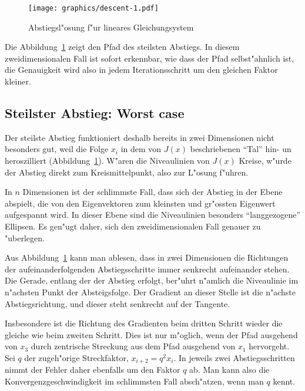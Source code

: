 \begin{figure}
\begin{center}
\texttt{[image: graphics/descent-1.pdf]}
\end{center}
\caption{Abstiegsl"osung f"ur lineares Gleichungsystem
\label{descent:path}}
\end{figure}

Die Abbildung~\ref{descent:path} zeigt den Pfad des steilsten Abstiegs.
In diesem zweidimensionalen Fall ist sofort erkennbar, wie dass der
Pfad selbst"ahnlich ist, die Genauigkeit wird also in jedem Iterationsschritt
um den gleichen Faktor kleiner.

\subsection{Steilster Abstieg: Worst case}
Der steilste Abstieg funktioniert deshalb bereits in zwei Dimensionen
nicht besonders gut, weil die Folge $x_i$ in dem von $J(x)$ beschriebenen
``Tal'' hin- un heroszilliert (Abbildung~\ref{descent:path}).
W"aren die Niveaulinien von $J(x)$ Kreise, w"urde der Abstieg direkt
zum Kreismittelpunkt, also zur L"osung f"uhren.

In $n$ Dimensionen ist der schlimmste Fall, dass sich der Abstieg in
der Ebene abspielt, die von den Eigenvektoren zum kleinsten und gr"ossten
Eigenwert aufgespannt wird.
In dieser Ebene sind die Niveaulinien besonders ``langgezogene'' 
Ellipsen.
Es gen"ugt daher, sich den zweidimensionalen Fall genauer zu "uberlegen.

Aus Abbildung~\ref{descent:path} kann man ablesen,
dass in zwei Dimensionen die Richtungen der aufeinanderfolgenden 
Abstiegsschritte immer senkrecht aufeinander stehen.
Die Gerade, entlang der der Abstieg erfolgt, ber"uhrt n"amlich die
Niveaulinie im n"achsten Punkt der Absteigsfolge. 
Der Gradient an dieser Stelle ist die n"achste Abstiegsrichtung, und
dieser steht senkrecht auf der Tangente.

Insbesondere ist die Richtung des Gradienten beim dritten Schritt wieder
die gleiche wie beim zweiten Schritt.
Dies ist nur m"oglich, wenn der Pfad ausgehend von $x_3$ durch
zentrische Streckung aus dem Pfad ausgehend von $x_1$ hervorgeht.
Sei $q$ der zugeh"orige Streckfaktor, $x_{i+2}=q^2x_i$.
In jeweils zwei Abstiegsschritten nimmt der Fehler daher ebenfalls um
den Faktor $q$ ab. Man kann also die Konvergenzgeschwindigkeit im
schlimmsten Fall absch"atzen, wenn man $q$ kennt.


